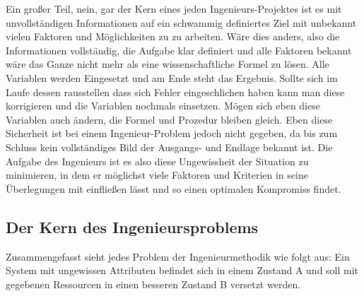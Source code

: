     Ein großer Teil, nein, gar der Kern eines jeden Ingenieurs-Projektes ist es mit unvollständigen 
    Informationen auf ein schwammig definiertes Ziel mit unbekannt vielen Faktoren und Möglichkeiten 
    zu zu arbeiten. Wäre dies anders, also die Informationen vollständig, die Aufgabe klar definiert 
    und alle Faktoren bekannt wäre das Ganze nicht mehr als eine wissenschaftliche Formel zu lösen. 
    Alle Variablen werden Eingesetzt und am Ende steht das Ergebnis. Sollte sich im Laufe dessen 
    rausstellen dass sich Fehler eingeschlichen haben kann man diese korrigieren und die Variablen 
    nochmals einsetzen. Mögen sich eben diese Variablen auch ändern, die Formel und Prozedur bleiben 
    gleich. Eben diese Sicherheit ist bei einem Ingenieur-Problem jedoch nicht gegeben, da bis zum 
    Schluss kein vollständiges Bild der Ausgangs- und Endlage bekannt ist.
    Die Aufgabe des Ingenieurs ist es also diese Ungewissheit der Situation zu minimieren, in dem er 
    möglichst viele Faktoren und Kriterien in seine Überlegungen mit einfließen lässt und so einen 
    optimalen Kompromiss findet.

    \subsection{Der Kern des Ingenieursproblems}

    Zusammengefasst sieht jedes Problem der Ingenieurmethodik wie folgt aus: Ein System mit 
    ungewissen Attributen befindet sich in einem Zustand A und soll mit gegebenen Ressourcen in 
    einen besseren Zustand B versetzt werden.


